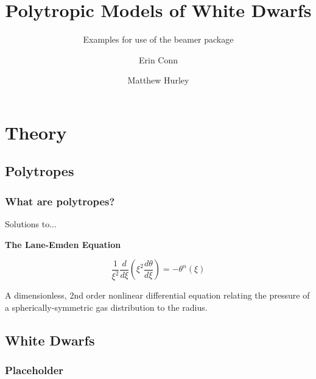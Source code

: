 \documentclass{beamer}
\title[Polytropes] %
{Polytropic Models of White Dwarfs}
\subtitle{Examples for use of the beamer package}
\author[Conn, Hurley] %
{Erin Conn \and Matthew Hurley}
\begin{document}
    \frame{\titlepage}

    \section{Theory}

        \subsection{Polytropes}

        \begin{frame}
            \frametitle{What are polytropes?}

            Solutions to...

            \textbf{The Lane-Emden Equation}

            \[\frac{1}{\xi^2}\frac{d}{d\xi}\left(\xi^2\frac{d\theta}{d\xi}\right)=-\theta^n(\xi) \]

            A dimensionless, 2nd order nonlinear differential equation relating the
            pressure of a spherically-symmetric gas distribution to the radius.

        \end{frame}

%
%
%
%
%
%
%

        \subsection{White Dwarfs}

        \begin{frame}
            \frametitle{Placeholder}

        \end{frame}
\end{document}

